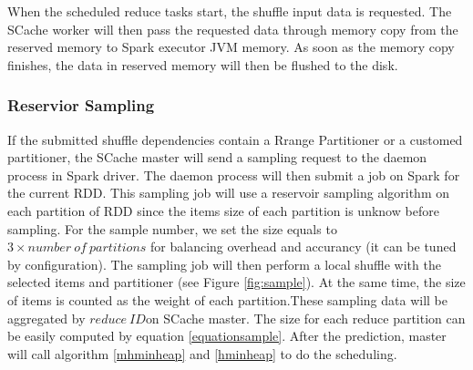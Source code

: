 When the scheduled reduce tasks start, the shuffle input data is requested. The SCache worker will then pass the requested data through memory copy from the reserved memory to Spark executor JVM memory. As soon as the memory copy finishes, the data in reserved memory will then be flushed to the disk.

\subsubsection{Reservior Sampling}\label{sampling}
If the submitted shuffle dependencies contain a Rrange Partitioner or a customed partitioner, the SCache master will send a sampling request to the daemon process in Spark driver. The daemon process will then submit a job on Spark for the current RDD. This sampling job will use a reservoir sampling algorithm\cite{reservoir} on each partition of RDD since the items size of each partition is unknow before sampling. For the sample number, we set the size equals to $3 \times number\ of\ partitions$ for balancing overhead and accurancy (it can be tuned by configuration). The sampling job will then perform a local shuffle with the selected items and partitioner (see Figure \ref{fig:sample}). At the same time, the size of items is counted as the weight of each partition.These sampling data will be aggregated by $reduce\ ID$on SCache master. The size for each reduce partition can be easily computed by equation \ref{equationsample}. After the prediction, master will call algorithm \ref{mhminheap} and \ref{hminheap} to do the scheduling. 


